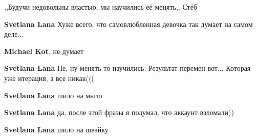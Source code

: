 \begin{itemize}
,,Будучи недовольны властью, мы научились её менять,, Стёб

\begin{itemize}
 
\textbf{Svetlana Lana} Хуже всего, что самовлюбленная девочка так думает на самом деле...

 
\textbf{Michael Kot}, не думает

 
\textbf{Svetlana Lana} Не, ну менять то научились. Результат перемен вот... Которая уже итерация, а все никак(((

 
\textbf{Svetlana Lana} шило на мыло

 
\textbf{Svetlana Lana} да, после этой фразы я подумал, что аккаунт взломали))

 
\textbf{Svetlana Lana} шило на швайку

 

\end{itemize}
\end{itemize}
